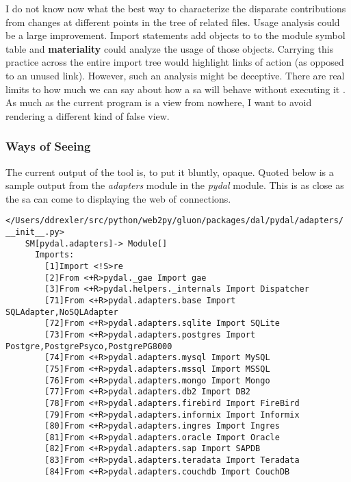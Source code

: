 \documentclass[a4paper,man,natbib,floatsintext]{apa6}
\begin{document}
  I do not know now what the best way to characterize the disparate contributions from changes at different points in the tree of related files. Usage analysis could be a large improvement. Import statements add objects to to the module symbol table and \textbf{materiality} could analyze the usage of those objects. Carrying this practice across the entire import tree would highlight links of action (as opposed to an unused link). However, such an analysis might be deceptive. There are real limits to how much we can say about how a \gls{sa} will behave without executing it \citet{Kaplan_undated-xy}. As much as the current program is a view from nowhere, I want to avoid rendering a different kind of false view.

  \subsubsection{Ways of Seeing}
  The current output of the tool is, to put it bluntly, opaque. Quoted below is a sample output from the \textit{adapters} module in the \textit{pydal} module. This is as close as the \gls{sa} can come to displaying the web of connections. 

  \singlespace
  \begin{Verbatim}[fontsize=\small]
    </Users/ddrexler/src/python/web2py/gluon/packages/dal/pydal/adapters/ __init__.py>
    SM[pydal.adapters]-> Module[]
      Imports:
        [1]Import <!S>re
        [2]From <+R>pydal._gae Import gae
        [3]From <+R>pydal.helpers._internals Import Dispatcher
        [71]From <+R>pydal.adapters.base Import SQLAdapter,NoSQLAdapter
        [72]From <+R>pydal.adapters.sqlite Import SQLite
        [73]From <+R>pydal.adapters.postgres Import Postgre,PostgrePsyco,PostgrePG8000
        [74]From <+R>pydal.adapters.mysql Import MySQL
        [75]From <+R>pydal.adapters.mssql Import MSSQL
        [76]From <+R>pydal.adapters.mongo Import Mongo
        [77]From <+R>pydal.adapters.db2 Import DB2
        [78]From <+R>pydal.adapters.firebird Import FireBird
        [79]From <+R>pydal.adapters.informix Import Informix
        [80]From <+R>pydal.adapters.ingres Import Ingres
        [81]From <+R>pydal.adapters.oracle Import Oracle
        [82]From <+R>pydal.adapters.sap Import SAPDB
        [83]From <+R>pydal.adapters.teradata Import Teradata
        [84]From <+R>pydal.adapters.couchdb Import CouchDB
  \end{Verbatim}
  \doublespace
\end{document}
